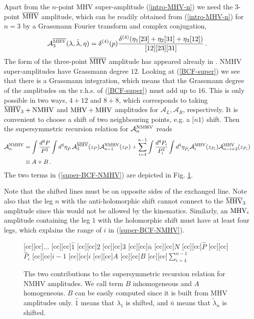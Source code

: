 \documentclass[12pt]{article}
\def \be  {\begin{equation}}
\def \ee  {\end{equation}}
\newcommand\lr[1]{{\left({#1}\right)}}
\newcommand \widebar [1] {\overline{#1}}
\def\bMHV{\overline{\rm MHV}}
\begin{document}
Apart from the $n$-point MHV super-amplitude (\ref{intro-MHV-n})
we need the $3$-point $\widebar{\rm MHV}$ amplitude, which can be
readily obtained from (\ref{intro-MHV-n}) for $n=3$ by a Grassmann
Fourier transform and complex conjugation,
\be
\label{bar-MHV3}
  {\cal A}^{\rm \widebar{MHV}}_{3}(\lambda,\tilde\lambda,\eta) = \delta^{(4)}(p)
  \frac{\delta^{(4)}\lr{\eta_1[23]+\eta_2[31]+\eta_3[12]}}{[12][23][31]}\,.
\ee 
The form of the three-point $\bMHV$ amplitude has appeared already in \cite{arkani,Brandhuber:2008pf,ArkaniHamed:2008gz,dhks6}.
NMHV super-amplitudes have Grassmann degree $12$. Looking at
(\ref{BCF-super}) we see that there is a Grassmann integration,
which means that the Grassmann degree of the amplitudes on the
r.h.s. of (\ref{BCF-super}) must add up to $16$. This is only
possible in two ways, $4+12$ and $8+8$, which corresponds to
taking $\widebar{\rm MHV}_{3} + {\rm NMHV}$ and ${\rm MHV} + {\rm
MHV}$ amplitudes for $\mathcal{A}_{L},\mathcal{A}_{R}$,
respectively. It is convenient to choose a shift of two
neighbouring points, e.g. a $\lbrack n 1 \rangle$ shift. Then the
supersymmetric recursion relation for $\mathcal{A}_{n}^{\rm NMHV}$
reads
\begin{align}
\label{super-BCF-NMHV}
\mathcal{A}_{n}^{\rm NMHV} &= \int
\frac{d^{4}P}{P^2} \int d^{4} \eta_{\hat{P}} \,
\mathcal{A}_{3}^{\rm \widebar{MHV}}(z_{P}) \mathcal{A}_{n-1}^{\rm
NMHV}(z_{P}) + \sum_{i=4}^{n-1}  \int \frac{d^{4}P_{i}}{P_{i}^2}
\int d^{4}\eta_{\hat{P}_{i}} \mathcal{A}_{i}^{\rm MHV}(z_{P_{i}}) 
\mathcal{A}_{n-i+2}^{\rm MHV}(z_{P_{i}})\notag\\
&\equiv A + B\, .
\end{align}
The two terms in
(\ref{super-BCF-NMHV}) are depicted in Fig. \ref{fig1}.

Note that the shifted lines must be on opposite sides of the
exchanged line. Note also that the leg $n$ with the
anti-holomorphic shift cannot connect to the $\widebar{\rm
MHV}_{3}$ amplitude since this would not be allowed by the
kinematics. Similarly, an ${\rm MHV}_{i}$ amplitude containing the
leg $1$ with the holomorphic shift must have at least four
legs, which explains the range of $i$ in
(\ref{super-BCF-NMHV}).

\begin{figure}
[cc][cc]{$\ldots$}
[cc][cc]{$\hat{1}$}
[cc][cc]{$2$}
[cc][cc]{$3$}
[cc][cc]{$\bar{n}$}
[cc][cc]{$N$}
[cc][cc]{$\hat{P}$}
[cc][cc]{$\hat{P}_{i}$}
[cc][cc]{\hspace{0.5cm}$i-1$}
[cc][cc]{$i$}
[cc][cc]{$A$}
[cc][cc]{$B$}
[cc][cc]{$\sum_{i=4}^{n-1}$}
 \centerline{{
}}  \caption[]{\small
  The two contributions to the supersymmetric recursion relation for
  NMHV amplitudes. We call term $B$ inhomogeneous and $A$
  homogeneous. $B$ can be easily computed since it is built from MHV
  amplitudes only. $\hat{1}$ means that $\lambda_{1}$ is shifted, and
  $\bar{n}$ means that $\tilde{\lambda}_{n}$ is shifted.}
  \label{fig1}
\end{figure}
\end{document}
